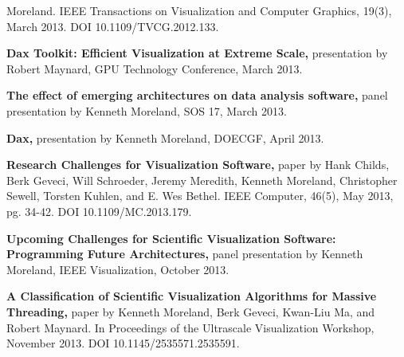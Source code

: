 \begin{description}
  Moreland. IEEE Transactions on Visualization and Computer Graphics,
  19(3), March 2013. DOI 10.1109/TVCG.2012.133.
\item\textbf{Dax Toolkit: Efficient Visualization at Extreme Scale,}
  presentation by Robert Maynard, GPU Technology Conference, March 2013.
\item\textbf{The effect of emerging architectures on data analysis
  software,} panel presentation by Kenneth Moreland, SOS 17, March 2013.
\item\textbf{Dax,} presentation by Kenneth Moreland, DOECGF, April 2013.
\item\textbf{Research Challenges for Visualization Software,} paper by Hank
  Childs, Berk Geveci, Will Schroeder, Jeremy Meredith, Kenneth Moreland,
  Christopher Sewell, Torsten Kuhlen, and E. Wes Bethel. IEEE Computer,
  46(5), May 2013, pg. 34-42. DOI 10.1109/MC.2013.179.
\item\textbf{Upcoming Challenges for Scientific Visualization Software:
  Programming Future Architectures,} panel presentation by Kenneth
  Moreland, IEEE Visualization, October 2013.
\item\textbf{A Classification of Scientific Visualization Algorithms for
  Massive Threading,} paper by Kenneth Moreland, Berk Geveci, Kwan-Liu Ma,
  and Robert Maynard. In Proceedings of the Ultrascale Visualization
  Workshop, November 2013. DOI 10.1145/2535571.2535591.
\end{description}
